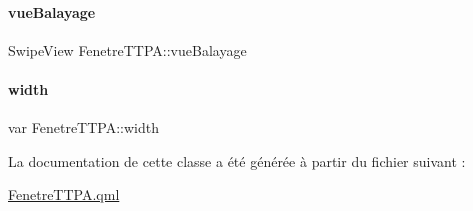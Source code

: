 \paragraph{\texorpdfstring{vue\+Balayage}{vueBalayage}}
{\footnotesize\ttfamily Swipe\+View Fenetre\+T\+T\+P\+A\+::vue\+Balayage\hspace{0.3cm}{\ttfamily [private]}}

\mbox{\label{class_fenetre_t_t_p_a_a6e3f108c98a7498a9ee09b6b9a557fcf}} 
\paragraph{\texorpdfstring{width}{width}}
{\footnotesize\ttfamily var Fenetre\+T\+T\+P\+A\+::width\hspace{0.3cm}{\ttfamily [private]}}



La documentation de cette classe a été générée à partir du fichier suivant \+:\begin{DoxyCompactItemize}
\item 
\hyperlink{_fenetre_t_t_p_a_8qml}{Fenetre\+T\+T\+P\+A.\+qml}\end{DoxyCompactItemize}
